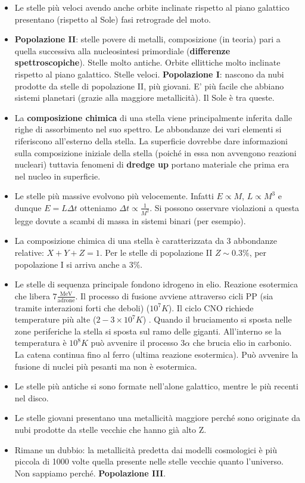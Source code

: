 \documentclass[11pt,a4paper]{article}
\begin{document}
\begin{itemize}
\item Le stelle più veloci avendo anche orbite inclinate rispetto al piano galattico presentano (rispetto al Sole) fasi retrograde del moto.

\item \textbf{Popolazione II}: stelle povere di metalli, composizione (in teoria) pari a quella successiva alla nucleosintesi primordiale (\textbf{differenze spettroscopiche}). Stelle molto antiche. Orbite ellittiche molto inclinate rispetto al piano galattico. Stelle veloci.
\textbf{Popolazione I}: nascono da  nubi prodotte da stelle di popolazione II, più giovani. E' più facile che abbiano sistemi planetari (grazie alla maggiore metallicità). Il Sole è tra queste.

\item La \textbf{composizione chimica} di una stella viene principalmente inferita dalle righe di assorbimento nel suo spettro. Le abbondanze dei vari elementi si riferiscono all'esterno della stella. La superficie dovrebbe dare informazioni sulla composizione iniziale della stella (poiché in essa non avvengono reazioni nucleari) tuttavia fenomeni di \textbf{dredge up} portano materiale che prima era nel nucleo in superficie.

\item Le stelle più massive evolvono più velocemente. Infatti $E \propto M$, $L \propto M^3$ e dunque $E = L \Delta t$ otteniamo $\Delta t \propto \frac{1}{M^2}$. Si possono osservare violazioni a questa legge dovute a scambi di massa in sistemi binari (per esempio).

\item La composizione chimica di una stella è caratterizzata da 3 abbondanze relative: $X+Y+Z = 1$. Per le stelle di popolazione II $Z \sim 0.3\%$, per popolazione I si arriva anche a $3\%$.

\item Le stelle di sequenza principale fondono idrogeno in elio. Reazione esotermica che libera $7\frac{\text{MeV}}{\text{adrone}}$. Il processo di fusione avviene attraverso cicli PP (sia tramite interazioni forti che deboli) ($10^7 K$). Il ciclo CNO richiede temperature più alte ($2-3 \times 10^7 K$) . Quando il bruciamento si sposta nelle zone periferiche la stella si sposta sul ramo delle giganti. All'interno se la temperatura è $10^8 K$ può avvenire il processo $3 \alpha$ che brucia elio in carbonio. La catena continua fino al ferro (ultima reazione esotermica). Può avvenire la fusione di nuclei più pesanti ma non è esotermica.

\item Le stelle più antiche si sono formate nell'alone galattico, mentre le più recenti nel disco.

\item Le stelle giovani presentano una metallicità  maggiore perché sono originate da nubi prodotte da stelle vecchie che hanno già alto Z.

\item Rimane un dubbio: la metallicità predetta dai modelli cosmologici è più piccola di 1000 volte quella presente nelle stelle vecchie quanto l'universo. Non sappiamo perché. \textbf{Popolazione III}.
\end{itemize}
\end{document}
